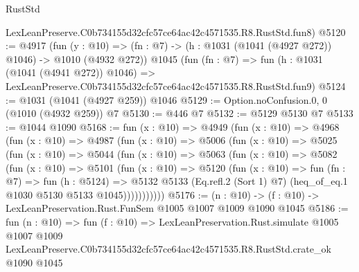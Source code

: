 \begin{lexlean}{RustStd}
\begin{coremodule}
    LexLeanPreserve.C0b734155d32cfc57ce64ac42c4571535.R8.RustStd.fun8)
@5120 := @4917
    (fun (y : @10) => (fn : @7) -> (h : @1031 (@1041 (@4927 @272)) @1046) -> @1010 (@4932 @272))
    @1045
    (fun (fn : @7) =>
    fun (h : @1031 (@1041 (@4941 @272)) @1046) =>
    LexLeanPreserve.C0b734155d32cfc57ce64ac42c4571535.R8.RustStd.fun9)
@5124 := @1031 (@1041 (@4927 @259)) @1046
@5129 := Option.noConfusion.{0, 0} (@1010 (@4932 @259)) @7
@5130 := @446 @7
@5132 := @5129 @5130 @7
@5133 := @1044 @1090
@5168 := fun (x : @10) =>
  @4949
    (fun (x : @10) =>
    @4968
      (fun (x : @10) =>
      @4987
        (fun (x : @10) =>
        @5006
          (fun (x : @10) =>
          @5025
            (fun (x : @10) =>
            @5044
              (fun (x : @10) =>
              @5063
                (fun (x : @10) =>
                @5082
                  (fun (x : @10) =>
                  @5101
                    (fun (x : @10) =>
                    @5120
                      (fun (x : @10) =>
                      fun (fn : @7) =>
                      fun (h : @5124) =>
                      @5132
                        @5133
                        (Eq.refl.{2} (Sort 1) @7)
                        (heq_of_eq.{1} @1030 @5130 @5133 @1045)))))))))))
@5176 := (n : @10) -> (f : @10) -> LexLeanPreservation.Rust.FunSem @1005 @1007 @1009 @1090 @1045
@5186 := fun (n : @10) =>
  fun (f : @10) =>
  LexLeanPreservation.Rust.simulate
    @1005
    @1007
    @1009
    LexLeanPreserve.C0b734155d32cfc57ce64ac42c4571535.R8.RustStd.crate_ok
    @1090
    @1045
\end{coremodule}
\end{lexlean}
